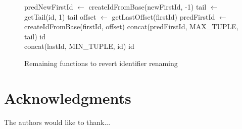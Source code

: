\documentclass[10pt,journal,compsoc]{IEEEtran}
\let\MYoriglatexcaption\caption
\renewcommand{\caption}[2][\relax]{\MYoriglatexcaption[#2]{#2}}
\begin{document}
\begin{figure}
    \begin{algorithmic}
            \State predNewFirstId $\gets$ createIdFromBase(newFirstId, -1)
                \State tail $\gets$ getTail(id, 1)
                    \State \Return tail
                \Else
                    \State offset $\gets$ getLastOffset(firstId)
                    \State predFirstId $\gets$ createIdFromBase(firstId, offset)
                    \State \Return concat(predFirstId, MAX\_TUPLE, tail)
                \EndIf
            \Else
                \State \Return id
            \EndIf
        \EndFunction
        \\
                \State \Return concat(lastId, MIN\_TUPLE, id)
            \Else
                \State \Return id
            \EndIf
        \EndFunction
    \end{algorithmic}
    \caption{Remaining functions to revert identifier renaming}
\end{figure}

\section*{Acknowledgments}

The authors would like to thank...


\ifCLASSOPTIONcaptionsoff
  \newpage
\fi








%
\end{document}
